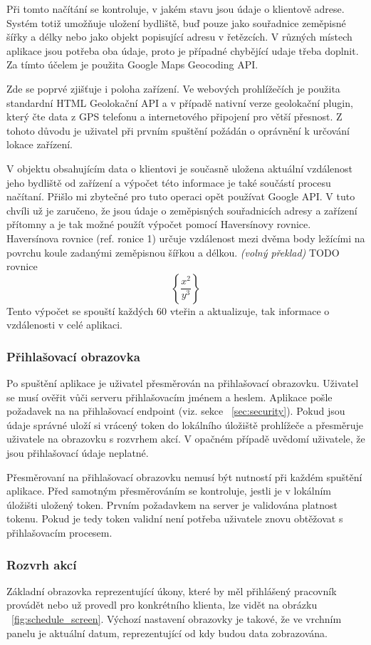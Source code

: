 \documentclass[
  biblatex,
  glossaries,
  index
]{kidiplom}
\begin{document}
Při tomto načítání se kontroluje, v jakém stavu jsou údaje o klientově adrese. Systém totiž umožňuje uložení bydliště, buď pouze jako souřadnice zeměpisné šířky a délky nebo jako objekt popisující adresu v řetězcích. V různých místech aplikace jsou potřeba oba údaje, proto je případné chybějící udaje třeba doplnit. Za tímto účelem je použita Google Maps Geocoding API. 

Zde se poprvé zjišťuje i poloha zařízení. Ve webových prohlížečích je použita standardní HTML Geolokační API a v případě nativní verze geolokační plugin, který čte data z GPS telefonu a internetového připojení pro větší přesnost. Z tohoto důvodu je uživatel při prvním spuštění požádán o oprávnění k určování lokace zařízení.

V objektu obsahujícím data o klientovi je současně uložena aktuální vzdálenost jeho bydliště od zařízení a výpočet této informace je také součástí procesu načítaní. Přišlo mi zbytečné pro tuto operaci opět používat Google API. V tuto chvíli už je zaručeno, že jsou údaje o zeměpisných souřadnicích adresy a zařízení přítomny a je tak možné použít výpočet pomocí Haversínovy rovnice. Haversínova rovnice (ref. ronice 1) určuje vzdálenost mezi dvěma body ležícími na povrchu koule zadanými zeměpisnou šířkou a délkou.\cite{13} \textit{(volný překlad)} TODO rovnice
$$\left\{\frac{x^2}{y^3}\right\}$$
 Tento výpočet se spouští každých 60 vteřin a aktualizuje, tak informace o vzdálenosti v celé aplikaci.

\subsubsection{Přihlašovací obrazovka}
Po spuštění aplikace je uživatel přesměrován na přihlašovací obrazovku. Uživatel se musí ověřit vůči serveru přihlašovacím jménem a heslem. Aplikace pošle požadavek na na přihlašovací endpoint (viz. sekce ~\ref{sec:security}). Pokud jsou údaje správné uloží si vrácený token do lokálního úložiště prohlížeče a přesměruje uživatele na obrazovku s rozvrhem akcí. V opačném případě uvědomí uživatele, že jsou přihlašovací údaje neplatné.
  
Přesměrovaní na přihlašovací obrazovku nemusí být nutností při každém spuštění aplikace. Před samotným přesměrováním se kontroluje, jestli je v lokálním úložišti uložený token. Prvním požadavkem na server je validována platnost tokenu. Pokud je tedy token validní není potřeba uživatele znovu obtěžovat s přihlašovacím procesem.

\subsubsection{Rozvrh akcí}
Základní obrazovka reprezentující úkony, které by měl přihlášený pracovník provádět nebo už provedl pro konkrétního klienta, lze vidět na obrázku ~\ref{fig:schedule_screen}. Výchozí nastavení obrazovky je takové, že ve vrchním panelu je aktuální datum, reprezentující od kdy budou data zobrazována. 
\end{document}

